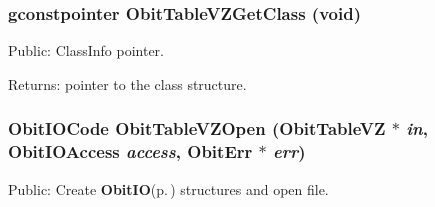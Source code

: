 \subsubsection{\setlength{\rightskip}{0pt plus 5cm}gconstpointer Obit\-Table\-VZGet\-Class (void)}\label{ObitTableVZ_8h_a13}


Public: Class\-Info pointer. 

\begin{Desc}
\item[Returns:]pointer to the class structure. \end{Desc}
\subsubsection{\setlength{\rightskip}{0pt plus 5cm}Obit\-IOCode Obit\-Table\-VZOpen ({\bf Obit\-Table\-VZ} $\ast$ {\em in}, Obit\-IOAccess {\em access}, {\bf Obit\-Err} $\ast$ {\em err})}\label{ObitTableVZ_8h_a17}


Public: Create {\bf Obit\-IO}{\rm (p.\,\pageref{structObitIO})} structures and open file. 

